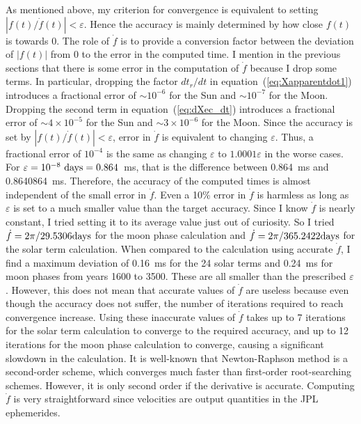 \documentclass[12pt]{article}
\begin{document}
\begin{CJK}{UTF8}{bkai}
As mentioned above, my criterion for convergence is equivalent to setting 
$|f(t)/\dot{f}(t)|<\varepsilon$. Hence the accuracy is mainly determined by how 
close $f(t)$ is towards 0. The role of $\dot{f}$ is to provide a conversion 
factor between the deviation of $|f(t)|$ from 0 to the error in the computed time. 
I mention in the previous sections that there is some error in the computation 
of $\dot{f}$ because I drop some terms. In particular, dropping the factor 
$dt_r/dt$ in equation~(\ref{eq:Xapparentdot1}) introduces a fractional error of 
$\sim 10^{-6}$ for the Sun and $\sim 10^{-7}$ for the Moon. Dropping the second term 
in equation~(\ref{eq:dXec_dt}) introduces a fractional error of $\sim 4\times 10^{-5}$ 
for the Sun and $\sim 3\times 10^{-6}$ for the Moon. Since the accuracy is 
set by $|f(t)/\dot{f}(t)|<\varepsilon$, error in $\dot{f}$ is equivalent to changing 
$\varepsilon$. Thus, a fractional error of $10^{-4}$ is the same as changing 
$\varepsilon$ to $1.0001 \varepsilon$ in the worse cases. 
For $\varepsilon=10^{-8}~{\rm days}=0.864$~ms, 
that is the difference between 0.864~ms and 0.8640864~ms. Therefore, the accuracy 
of the computed times is almost independent of the small error in $\dot{f}$. Even 
a 10\% error in $\dot{f}$ is harmless as long as $\varepsilon$ is set to a much 
smaller value than the target accuracy. Since I know $\dot{f}$ is nearly constant, 
I tried setting it to its average value just out of curiosity. So 
I tried $\dot{f}=2\pi/29.5306{\rm days}$ for the moon phase calculation and 
$\dot{f}=2\pi/365.2422{\rm days}$ for the solar term calculation. When compared 
to the calculation using accurate $\dot{f}$, I find a maximum deviation of 0.16~ms 
for the 24 solar terms and 0.24~ms for moon phases from years 1600 to 3500. These 
are all smaller than the prescribed $\varepsilon$. However, this does not mean 
that accurate values of $\dot{f}$ are useless because even though the accuracy does 
not suffer, the number of iterations required to reach convergence increase. 
Using these inaccurate values of $\dot{f}$ takes 
up to 7 iterations for the solar term calculation to converge to the required accuracy, 
and up to 12 iterations for the moon phase calculation to converge, causing a significant 
slowdown in the calculation. It is well-known that Newton-Raphson method is a second-order 
scheme, which converges much faster than first-order root-searching schemes. 
However, it is only second order if the derivative is accurate. Computing $\dot{f}$ 
is very straightforward since velocities are output quantities in the JPL 
ephemerides.


\end{CJK}
\end{document}
